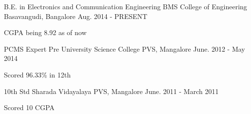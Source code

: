 \begin{cventries}
  \cventry
    {B.E. in Electronics and Communication Engineering}
    {BMS College of Engineering}
    {Basavangudi, Bangalore}
    {Aug. 2014 - PRESENT}
    {
      \begin{cvitems}
        \item {CGPA being 8.92 as of now}
      \end{cvitems}
    }
    \cventry
    {PCMS}
    {Expert Pre University Science College}
    {PVS, Mangalore}
    {June. 2012 - May 2014}
    {
      \begin{cvitems}
        \item {Scored 96.33\% in 12th}
      \end{cvitems}
    }
    \cventry
    {10th Std}
    {Sharada Vidayalaya}
    {PVS, Mangalore}
    {June. 2011 - March 2011}
    {
      \begin{cvitems}
        \item {Scored 10 CGPA}
      \end{cvitems}
    }
\end{cventries}
